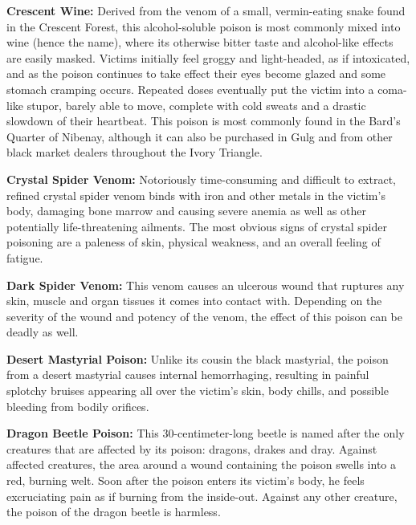 \textbf{Crescent Wine:} Derived from the venom of a small, vermin-eating snake found in the Crescent Forest, this alcohol-soluble poison is most commonly mixed into wine (hence the name), where its otherwise bitter taste and alcohol-like effects are easily masked. Victims initially feel groggy and light-headed, as if intoxicated, and as the poison continues to take effect their eyes become glazed and some stomach cramping occurs. Repeated doses eventually put the victim into a coma-like stupor, barely able to move, complete with cold sweats and a drastic slowdown of their heartbeat. This poison is most commonly found in the Bard's Quarter of Nibenay, although it can also be purchased in Gulg and from other black market dealers throughout the Ivory Triangle.

\textbf{Crystal Spider Venom:} Notoriously time-consuming and difficult to extract, refined crystal spider venom binds with iron and other metals in the victim's body, damaging bone marrow and causing severe anemia as well as other potentially life-threatening ailments. The most obvious signs of crystal spider poisoning are a paleness of skin, physical weakness, and an overall feeling of fatigue.

\textbf{Dark Spider Venom:} This venom causes an ulcerous wound that ruptures any skin, muscle and organ tissues it comes into contact with. Depending on the severity of the wound and potency of the venom, the effect of this poison can be deadly as well.

\textbf{Desert Mastyrial Poison:} Unlike its cousin the black mastyrial, the poison from a desert mastyrial causes internal hemorrhaging, resulting in painful splotchy bruises appearing all over the victim's skin, body chills, and possible bleeding from bodily orifices.

\textbf{Dragon Beetle Poison:} This 30-centimeter-long beetle is named after the only creatures that are affected by its poison: dragons, drakes and dray. Against affected creatures, the area around a wound containing the poison swells into a red, burning welt. Soon after the poison enters its victim's body, he feels excruciating pain as if burning from the inside-out. Against any other creature, the poison of the dragon beetle is harmless.

